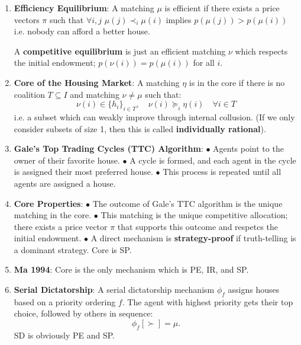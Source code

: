 \documentclass[8pt]{scrartcl}
\newcommand{\vocab}[1]{\textbf{\color{blue} #1}}
\begin{document}
\begin{multicols*}{2}
\begin{enumerate}
        \item \vocab{Efficiency Equilibrium}: A matching $\mu$ is efficient if there
        exists a price vectors $\pi$ such that $\forall i,j$ $\mu(j) \prec_i \mu(i)$
        implies $p(\mu(j)) > p(\mu(i))$ i.e. nobody can afford a better house.
        
        A \vocab{competitive equilibrium}
        is just an efficient matching $\nu$ which respects the initial endowment;
        $p(\nu(i)) = p(\mu(i))$ for all $i$.

        \item \vocab{Core of the Housing Market}:
        A matching \( \eta \) is in the core if there is no coalition \( T \subseteq I \) and matching \( \nu\neq \mu \) such that:
        \[
        \nu(i) \in \{h_i\}_{i \in T}, \quad \nu(i) \succeq_i \eta(i) \quad \forall i \in T
        \]
        i.e. a subset which can weakly improve through internal collusion.
        (If we only consider subsets of size 1, then this is called \vocab{individually rational}).

        \item \vocab{Gale’s Top Trading Cycles (TTC) Algorithm}:
        $\bullet$ Agents point to the owner of their favorite house.
        $\bullet$ A cycle is formed, and each agent in the cycle is assigned their most preferred house.
        $\bullet$ This process is repeated until all agents are assigned a house.

        \item \vocab{Core Properties}:
        $\bullet$ The outcome of Gale’s TTC algorithm is the unique matching in the core.
        $\bullet$ This matching is the unique competitive allocation; there exists
        a price vector $\pi$ that supports this outcome and respetcs the initial endowment.
        $\bullet$ A direct mechanism is
        \vocab{strategy-proof} if truth-telling is a dominant strategy. Core is SP.

        \item \vocab{Ma 1994}: Core is the only mechanism which is PE, IR, and SP.

        \item \vocab{Serial Dictatorship}:
        A serial dictatorship mechanism \( \phi_f \) assigns houses based on a priority ordering \( f \). The agent with highest priority gets their top choice, followed by others in sequence:
        \[
        \phi_f[ \succ ] = \mu.
        \]
        SD is obviously PE and SP.
    \end{enumerate}


\end{multicols*}
\end{document}
